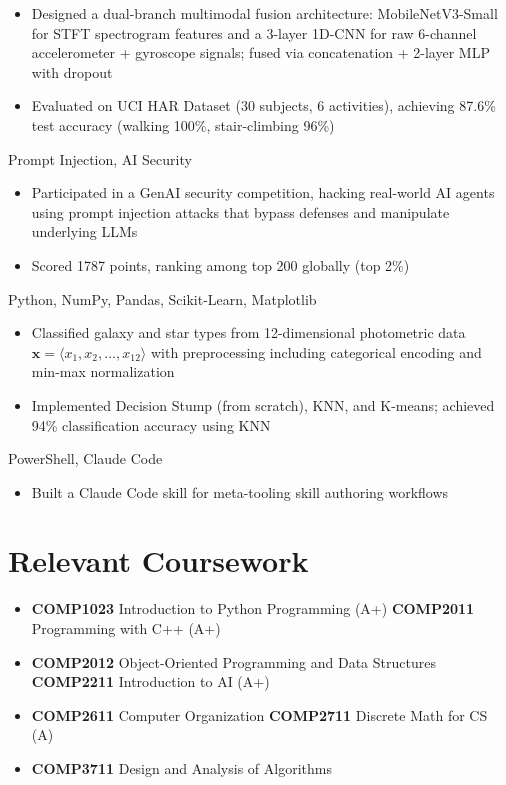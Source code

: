 \documentclass{common/resume}
\begin{document}
\begin{itemize}
  \item Designed a dual-branch multimodal fusion architecture: MobileNetV3-Small for STFT spectrogram features and a 3-layer 1D-CNN for raw 6-channel accelerometer + gyroscope signals; fused via concatenation + 2-layer MLP with dropout
  \item Evaluated on UCI HAR Dataset (30 subjects, 6 activities), achieving 87.6\% test accuracy (walking 100\%, stair-climbing 96\%)
\end{itemize}

  {Prompt Injection, AI Security}

\begin{itemize}
  \item Participated in a GenAI security competition, hacking real-world AI agents using prompt injection attacks that bypass defenses and manipulate underlying LLMs
  \item Scored 1787 points, ranking among top 200 globally (top 2\%)
\end{itemize}

  {Python, NumPy, Pandas, Scikit-Learn, Matplotlib}

\begin{itemize}
  \item Classified galaxy and star types from 12-dimensional photometric data $\mathbf{x} = \langle x_1, x_2, \ldots, x_{12} \rangle$ with preprocessing including categorical encoding and min-max normalization
  \item Implemented Decision Stump (from scratch), KNN, and K-means; achieved 94\% classification accuracy using KNN
\end{itemize}

  {PowerShell, Claude Code}

\begin{itemize}
  \item Built a Claude Code skill for meta-tooling skill authoring workflows
\end{itemize}

\section{Relevant Coursework}

\begin{itemize}
  \item \textbf{COMP1023} Introduction to Python Programming (A+) \hfill \textbf{COMP2011} Programming with C++ (A+)
  \item \textbf{COMP2012} Object-Oriented Programming and Data Structures \hfill \textbf{COMP2211} Introduction to AI (A+)
  \item \textbf{COMP2611} Computer Organization \hfill \textbf{COMP2711} Discrete Math for CS (A)
  \item \textbf{COMP3711} Design and Analysis of Algorithms
\end{itemize}
\end{document}
